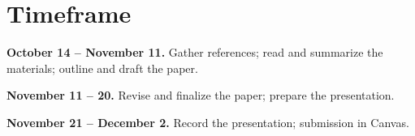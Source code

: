 \documentclass[11pt, letterpaper]{article}
\begin{document}
\nocite{*}
\printbibliography[heading=none]

\section{Timeframe}

\noindent\textbf{October 14 -- November 11.} Gather references; read and summarize the materials; outline and draft the paper.

\noindent\textbf{November 11 -- 20.} Revise and finalize the paper; prepare the presentation.

\noindent\textbf{November 21 -- December 2.} Record the presentation; submission in Canvas.
\end{document}
